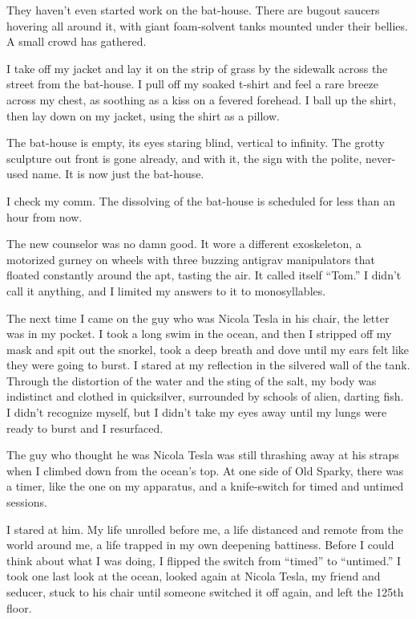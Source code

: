 \tb

They haven't even started work on the bat-house. There are bugout
saucers hovering all around it, with giant foam-solvent tanks
mounted under their bellies. A small crowd has gathered.

I take off my jacket and lay it on the strip of grass by the
sidewalk across the street from the bat-house. I pull off my soaked
t-shirt and feel a rare breeze across my chest, as soothing as a
kiss on a fevered forehead. I ball up the shirt, then lay down on
my jacket, using the shirt as a pillow.

The bat-house is empty, its eyes staring blind, vertical to
infinity. The grotty sculpture out front is gone already, and with
it, the sign with the polite, never-used name. It is now just the
bat-house.

I check my comm. The dissolving of the bat-house is scheduled for
less than an hour from now.

\tb

The new counselor was no damn good. It wore a different
exoskeleton, a motorized gurney on wheels with three buzzing
antigrav manipulators that floated constantly around the apt,
tasting the air. It called itself ``Tom.'' I didn't call it
anything, and I limited my answers to it to monosyllables.

The next time I came on the guy who was Nicola Tesla in his chair,
the letter was in my pocket. I took a long swim in the ocean, and
then I stripped off my mask and spit out the snorkel, took a deep
breath and dove until my ears felt like they were going to burst. I
stared at my reflection in the silvered wall of the tank. Through
the distortion of the water and the sting of the salt, my body was
indistinct and clothed in quicksilver, surrounded by schools of
alien, darting fish. I didn't recognize myself, but I didn't take
my eyes away until my lungs were ready to burst and I resurfaced.

The guy who thought he was Nicola Tesla was still thrashing away at
his straps when I climbed down from the ocean's top. At one side of
Old Sparky, there was a timer, like the one on my apparatus, and a
knife-switch for timed and untimed sessions.

I stared at him. My life unrolled before me, a life distanced and
remote from the world around me, a life trapped in my own deepening
battiness. Before I could think about what I was doing, I flipped
the switch from ``timed'' to ``untimed.'' I took one last look at
the ocean, looked again at Nicola Tesla, my friend and seducer,
stuck to his chair until someone switched it off again, and left
the 125th floor.

